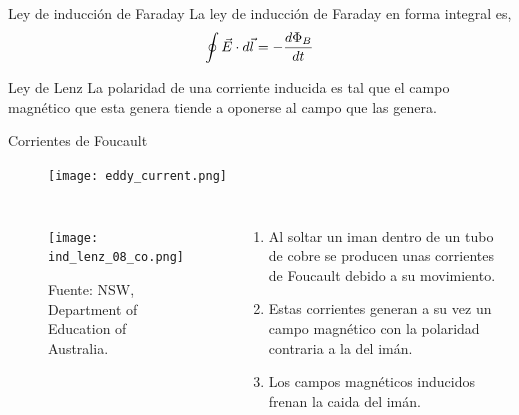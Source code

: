 \documentclass[]{presentation}
\begin{document}
\begin{frame}
	\begin{block}{Ley de inducción de Faraday}
		La ley de inducción de Faraday en forma integral es,
		$$
			\oint \vec{E} \cdot d\vec{l} = - \frac{d\Phi_B}{dt}
		$$
	\end{block}	
    \begin{block}{Ley de Lenz}
		La polaridad de una corriente inducida es tal que el campo magnético que esta genera tiende a oponerse al campo que las genera.
	\end{block}
\end{frame}

\begin{frame}{Corrientes de Foucault}
\begin{figure}
	\centering
	\texttt{[image: eddy\_current.png]}
\end{figure}
\end{frame}

\begin{frame}
\begin{columns}
	\begin{figure}
		\centering
		\texttt{[image: ind\_lenz\_08\_co.png]}
		\caption{\tiny Fuente: NSW, Department of Education of Australia.}
	\end{figure}
	\begin{enumerate}
		\item Al soltar un iman dentro de un tubo de cobre se producen unas corrientes de Foucault debido a su movimiento.
		\item Estas corrientes generan a su vez un campo magnético con la polaridad contraria a la del imán.
		\item Los campos magnéticos inducidos frenan la caida del imán.
	\end{enumerate}
\end{columns}
\end{frame}
\end{document}

